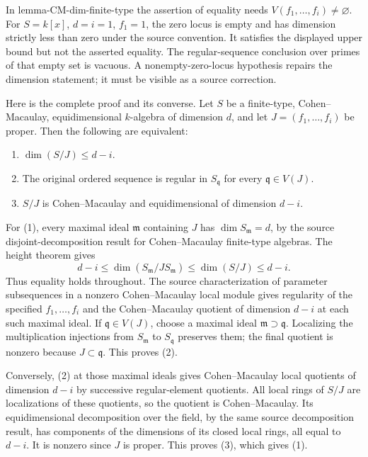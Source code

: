 In lemma-\AlgebraIdentifierBreak{}CM-\AlgebraIdentifierBreak{}dim-\AlgebraIdentifierBreak{}finite-\AlgebraIdentifierBreak{}type the assertion of equality needs \(V(f_1,\ldots,f_i)\ne\varnothing\). For \(S=k[x]\), \(d=i=1\), \(f_1=1\), the zero locus is empty and has dimension strictly less than zero under the source convention. It satisfies the displayed upper bound but not the asserted equality. The regular-sequence conclusion over primes of that empty set is vacuous. A nonempty-zero-locus hypothesis repairs the dimension statement; it must be visible as a source correction.

Here is the complete proof and its converse. Let \(S\) be a finite-type, Cohen--Macaulay, equidimensional \(k\)-algebra of dimension \(d\), and let \(J=(f_1,\ldots,f_i)\) be proper. Then the following are equivalent:

\begin{enumerate}
\def\labelenumi{\arabic{enumi}.}
\tightlist
\item
  \(\dim(S/J)\leq d-i\).
\item
  The original ordered sequence is regular in \(S_{\mathfrak q}\) for every \(\mathfrak q\in V(J)\).
\item
  \(S/J\) is Cohen--Macaulay and equidimensional of dimension \(d-i\).
\end{enumerate}

For (1), every maximal ideal \(\mathfrak m\) containing \(J\) has \(\dim S_{\mathfrak m}=d\), by the source disjoint-decomposition result for Cohen--Macaulay finite-type algebras. The height theorem gives \[
d-i\leq\dim(S_{\mathfrak m}/JS_{\mathfrak m})\leq\dim(S/J)\leq d-i.
\] Thus equality holds throughout. The source characterization of parameter subsequences in a nonzero Cohen--Macaulay local module gives regularity of the specified \(f_1,\ldots,f_i\) and the Cohen--Macaulay quotient of dimension \(d-i\) at each such maximal ideal. If \(\mathfrak q\in V(J)\), choose a maximal ideal \(\mathfrak m\supset\mathfrak q\). Localizing the multiplication injections from \(S_{\mathfrak m}\) to \(S_{\mathfrak q}\) preserves them; the final quotient is nonzero because \(J\subset\mathfrak q\). This proves (2).

Conversely, (2) at those maximal ideals gives Cohen--Macaulay local quotients of dimension \(d-i\) by successive regular-element quotients. All local rings of \(S/J\) are localizations of these quotients, so the quotient is Cohen--Macaulay. Its equidimensional decomposition over the field, by the same source decomposition result, has components of the dimensions of its closed local rings, all equal to \(d-i\). It is nonzero since \(J\) is proper. This proves (3), which gives (1).

